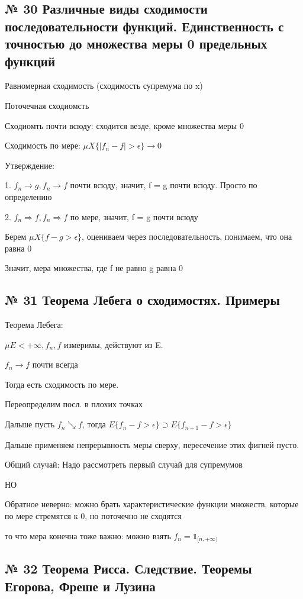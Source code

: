 \documentclass{article}
\begin{document}
\subsection{ \footnotesize № 30 Различные виды сходимости последовательности функций. Единственность с точностью до множества меры 0 предельных функций}

Равномерная сходимость (сходимость супремума по x)

Поточечная сходиомсть

Сходиомть почти всюду: сходится везде, кроме множества меры 0

Сходимость по мере: $\mu X\{|f_n - f| > \epsilon\} \rightarrow 0$

Утверждение:

1. $f_n \rightarrow g, f_n \rightarrow f$ почти всюду, значит, f = g почти всюду. Просто по определению

2. $f_n \Rightarrow f, f_n \Rightarrow f$ по мере, значит, f = g почти всюду

Берем $\mu X\{f - g > \epsilon\}$, оцениваем через последовательность, понимаем, что она равна 0

Значит, мера множества, где f не равно g равна 0

\subsection{ \footnotesize № 31 Теорема Лебега о сходимостях. Примеры}

Теорема Лебега:

$\mu E < +\infty, f_n, f$ измеримы, действуют из E.

$f_n \rightarrow f$ почти всегда

Тогда есть сходимость по мере.

Переопределим посл. в плохих точках

Дальше пусть $f_n \searrow f$, тогда $E\{f_n - f >\epsilon\} \supset E\{f_{n + 1} - f >\epsilon\}$

Дальше применяем непрерывность меры сверху, пересечение этих фигней пусто.

Общий случай: Надо рассмотреть первый случай для супремумов

НО


Обратное неверно: можно брать характеристические функции множеств, которые по мере стремятся к 0, но поточечно не сходятся

то что мера конечна тоже важно: можно взять $f_n = \mathbb{1}_{[n, +\infty)}$

\subsection{ \footnotesize № 32 Теорема Рисса. Следствие. Теоремы Егорова, Фреше и Лузина}
\end{document}
